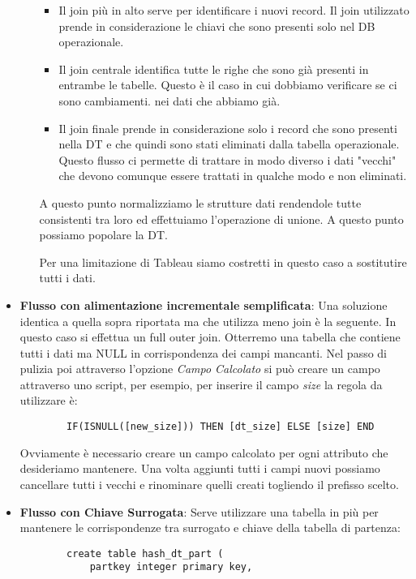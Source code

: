 \begin{itemize}
\begin{itemize}
\begin{itemize}
			\item Il join più in alto serve per identificare i nuovi record. Il join utilizzato prende in considerazione le chiavi che sono presenti solo nel DB operazionale.
			\item Il join centrale identifica tutte le righe che sono già presenti in entrambe le tabelle. Questo è il caso in cui dobbiamo verificare se ci sono cambiamenti. nei dati che abbiamo già.
			\item Il join finale prende in considerazione solo i record che sono presenti nella DT e che quindi sono stati eliminati dalla tabella operazionale. Questo flusso ci permette di trattare in modo diverso i dati "vecchi" che devono comunque essere trattati in qualche modo e non eliminati.
		\end{itemize}
		A questo punto normalizziamo le strutture dati rendendole tutte consistenti tra loro ed effettuiamo l'operazione di unione. A questo punto possiamo popolare la DT.
		\begin{warn}
			Per una limitazione di Tableau siamo costretti in questo caso a sostitutire tutti i dati.
		\end{warn}
	\end{itemize}
	\item \textbf{Flusso con alimentazione incrementale semplificata}:
	Una soluzione identica a quella sopra riportata ma che utilizza meno join è la seguente.
	In questo caso si effettua un full outer join. Otterremo una tabella che contiene tutti i dati ma NULL in corrispondenza dei campi mancanti. Nel passo di pulizia poi attraverso l'opzione \textit{Campo Calcolato} si può creare un campo attraverso uno script, per esempio, per inserire il campo \textit{size} la regola da utilizzare è:
	\begin{verbatim}
		IF(ISNULL([new_size])) THEN [dt_size] ELSE [size] END
	\end{verbatim}
	Ovviamente è necessario creare un campo calcolato per ogni attributo che desideriamo mantenere. Una volta aggiunti tutti i campi nuovi possiamo cancellare tutti i vecchi e rinominare quelli creati togliendo il prefisso scelto.
	\item \textbf{Flusso con Chiave Surrogata}:
	Serve utilizzare una tabella in più per mantenere le corrispondenze tra surrogato e chiave della tabella di partenza:
	\begin{verbatim}
		create table hash_dt_part (
			partkey integer primary key,

\end{verbatim}
\end{itemize}
